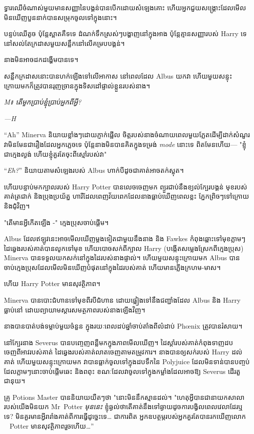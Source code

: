 ទ្វារ​ឈើ​ចំណាស់​មួយ​មាន​សញ្ញា​នៃ​បង្គន់​បាន​បើក​ដោយ​សំឡេង​គោះ ហើយ​អ្នក​ជួយ​សង្គ្រោះ​ដែល​មើល​មិន​ឃើញ​បួន​នាក់​បាន​សម្រុក​ចូល​ទៅ​ក្នុង​នោះ។

បន្ទប់ឈើតូច ប៉ុន្តែស្អាតគឺទទេ ដំណក់ទឹកស្រស់ៗបង្ហាញនៅក្នុងអាង ប៉ុន្តែគ្មានសញ្ញារបស់ Harry ទេ នៅសល់តែក្រដាសមួយសន្លឹកនៅលើគម្របបង្គន់។

នាងមិនអាចដកដង្ហើមបានទេ។

សន្លឹកក្រដាសនោះបានហក់ឡើងទៅលើអាកាស នៅពេលដែល Albus យកវា ហើយមួយសន្ទុះក្រោយមកក៏ត្រូវបានរុញច្រានក្នុងទិសដៅផ្ទាល់ខ្លួនរបស់នាង។

\emph{M៖ តើមួកប្រាប់ខ្ញុំប្រាប់អ្នកពីអ្វី?}

\emph{—H}

“Ah” Minerva និយាយខ្លាំងៗដោយភ្ញាក់ផ្អើល ចិត្តរបស់នាងចំណាយពេលមួយភ្លែតដើម្បីដាក់សំណួរ វាមិនមែនជារឿងដែលអ្នកភ្លេចទេ ប៉ុន្តែនាងមិនបានគិតក្នុងទម្រង់ \emph{mode} នោះទេ ពិតមែនហើយ— "ខ្ញុំជាក្មេងល្ងង់ ហើយខ្ញុំគួរតែចុះពីស្មៅរបស់វា"

“\emph{Eh?}” និយាយតាមសំឡេងរបស់ Albus ហាក់បីដូចជាគាត់អាចតក់ស្លុត។

ហើយបន្ទាប់មកក្បាលរបស់ Harry Potter បានលេចចេញមក ព្យួរជាប់នឹងខ្យល់ក្បែរបង្គន់ មុខរបស់គាត់ត្រជាក់ និងប្រុងប្រយ័ត្ន ហារីដែលពេញវ័យពេកដែលនាងធ្លាប់ឃើញពេលខ្លះ ភ្នែកព្រិចៗទៅក្រោយ និងជុំវិញ។

"តើមានអ្វីកើតឡើង -" ក្មេងប្រុសចាប់ផ្តើម។

Albus ដែលឥឡូវនេះអាចមើលឃើញម្តងទៀតជាមួយនឹងនាង និង Fawkes កំពុងឆ្ពោះទៅមុខភ្លាមៗ ដៃឆ្វេងរបស់គាត់បានលូកទៅមុខ ហើយបោចសក់ពីក្បាល Harry (បង្កើតសម្លេងស្រែកពីក្មេងប្រុស) Minerva បានទទួលយកសក់នៅក្នុងដៃរបស់នាងផ្ទាល់។ ហើយមួយសន្ទុះក្រោយមក Albus បានចាប់ក្មេងប្រុសដែលមើលមិនឃើញបំផុតនៅក្នុងដៃរបស់គាត់ ហើយមានភ្លើងក្រហម-មាស។

ហើយ Harry Potter មានសុវត្ថិភាព។

Minerva បានបោះជំហានទៅមុខពីរបីជំហាន ដោយផ្អៀងទៅនឹងជញ្ជាំងដែល Albus និង Harry ធ្លាប់នៅ ដោយព្យាយាមស្តារសមត្ថភាពរបស់នាងឡើងវិញ។

នាង​បាន​បាត់​បង់​ទម្លាប់​មួយ​ចំនួន ក្នុង​រយៈ​ពេល​ដប់​ឆ្នាំ​ចាប់​តាំង​ពី​លំដាប់ Phœnix ត្រូវ​បាន​រំសាយ។

នៅក្បែរនាង Severus បានបញ្ចេញពន្លឺមកក្នុងភាពមើលឃើញ។ ដៃស្តាំរបស់គាត់កំពុងទាញដបចេញពីអាវរបស់គាត់ ដៃឆ្វេងរបស់គាត់លាតចេញតាមតម្រូវការ។ នាងបានឲ្យសក់របស់ Harry ដល់គាត់ ហើយមួយសន្ទុះក្រោយមក វាបានធ្លាក់ចូលទៅក្នុងដបទឹកនៃ Polyjuice ដែលមិនទាន់បានបញ្ចប់ ដែលភ្លាមៗនោះចាប់ផ្តើមឆេះ និងពពុះ ខណៈដែលវាចូលទៅក្នុងកម្លាំងដែលអាចឱ្យ Severus ដើរតួជានុយ។

គ្រូ Potions Master បាននិយាយយឺតៗថា "នោះមិននឹកស្មានដល់។ "ហេតុអ្វីបានជានាយកសាលារបស់យើងមិនយក Mr~Potter \emph{មុននេះ} ខ្ញុំឆ្ងល់ថាតើគាត់នឹងទៅឆ្ងាយដូចការបង្វិលពេលវេលាដែរឬទេ? មិនគួរមានអ្វីរារាំងគាត់ពីការធ្វើដូច្នេះទេ… ជាការពិត អ្នកឧបត្ថម្ភរបស់អ្នកគួរតែបានរកឃើញលោក ~ Potter មានសុវត្ថិភាពរួចហើយ…”

